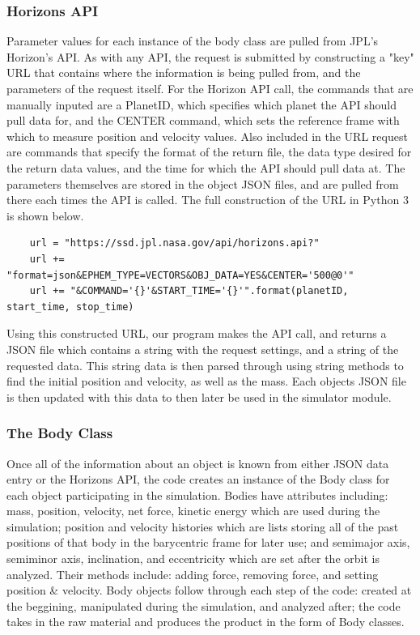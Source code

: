 \documentclass[a4paper,12pt]{article} %
\numberwithin{equation}{section} %
\numberwithin{figure}{section} %
\begin{document}
\subsubsection{Horizons API \cite{Horizons}}
\label{sec:API}

Parameter values for each instance of the body class are pulled from JPL's Horizon's API. As with any API, the request is submitted by constructing a "key" URL that contains where the information is being pulled from, and the parameters of the request itself. For the Horizon API call, the commands that are manually inputed are a PlanetID, which specifies which planet the API should pull data for, and the CENTER command, which sets the reference frame with which to measure position and velocity values. Also included in the URL request are commands that specify the format of the return file, the data type desired for the return data values, and the time for which the API should pull data at. The parameters themselves are stored in the object JSON files, and are pulled from there each times the API is called. The full construction of the URL in Python 3 is shown below.

\begin{verbatim}
    url = "https://ssd.jpl.nasa.gov/api/horizons.api?"
    url += "format=json&EPHEM_TYPE=VECTORS&OBJ_DATA=YES&CENTER='500@0'"
    url += "&COMMAND='{}'&START_TIME='{}'".format(planetID, start_time, stop_time)
\end{verbatim}

Using this constructed URL, our program makes the API call, and returns a JSON file which contains a string with the request settings, and a string of the requested data. This string data is then parsed through using string methods to find the initial position and velocity, as well as the mass. Each objects JSON file is then updated with this data to then later be used in the simulator module.

\subsubsection{The Body Class}
Once all of the information about an object is known from either JSON data entry or the Horizons API, the code creates an instance of the Body class for each object participating in the simulation. Bodies have attributes including: mass, position, velocity, net force, kinetic energy which are used during the simulation; position and velocity histories which are lists storing all of the past positions of that body in the barycentric frame for later use; and semimajor axis, semiminor axis, inclination, and eccentricity which are set after the orbit is analyzed. Their methods include: adding force, removing force, and setting position \& velocity. Body objects follow through each step of the code: created at the beggining, manipulated during the simulation, and analyzed after; the code takes in the raw material and produces the product in the form of Body classes.
\end{document}
